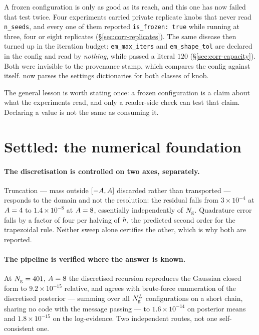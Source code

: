 \begin{pitfall}
A frozen configuration is only as good as its reach, and this one has now failed that test twice.
Four experiments carried private replicate knobs that never read \texttt{n\_seeds}, and every one
of them reported \texttt{is\_frozen: true} while running at three, four or eight replicates
(\S\ref{sec:corr-replicates}). The same disease then turned up in the iteration budget:
\texttt{em\_max\_iters} and \texttt{em\_shape\_tol} are declared in the config and read by
\emph{nothing}, while  passed a literal $120$
(\S\ref{sec:corr-capacity}). Both were invisible to the provenance stamp, which compares the
config against itself.  now parses the settings dictionaries
for both classes of knob.

The general lesson is worth stating once: a frozen configuration is a claim about what the
experiments read, and only a reader-side check can test that claim. Declaring a value is not the
same as consuming it.
\end{pitfall}

\section{Settled: the numerical foundation}
\label{sec:rec-rung0}

\paragraph{The discretisation is controlled on two axes, separately.} Truncation --- mass outside
$[-A,A]$ discarded rather than transported --- responds to the domain and not
the resolution: the residual falls from $3\times10^{-4}$ at $A=4$ to $1.4\times10^{-8}$
at $A=8$, essentially independently of $N_{\mathrm{g}}$. Quadrature error falls by a factor of
four per halving of $h$, the predicted second order for the trapezoidal rule. Neither sweep
alone certifies the other, which is why both are reported.

\paragraph{The pipeline is verified where the answer is known.} At $N_{\mathrm{g}}=401$, $A=8$
the discretised recursion reproduces the Gaussian closed form to $9.2\times10^{-15}$ relative,
and agrees with brute-force enumeration of the discretised posterior --- summing over all
$N_{\mathrm{g}}^{L}$ configurations on a short chain, sharing no code with the message passing ---
to $1.6\times10^{-14}$ on posterior means and $1.8\times10^{-15}$ on the log-evidence. Two
independent routes, not one self-consistent one.


